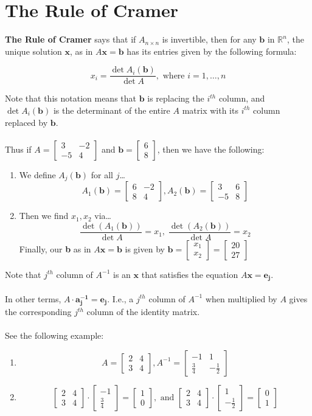 \documentclass[12pt]{article}
\newcommand{\R}{\mathbb{R}}
\newcommand{\bt}[1]{\textbf{{#1}}}
\newcommand{\bm}[1]{\mathbf{{#1}}}
\newcommand{\mb}{\begin{bmatrix}}
\newcommand{\me}{\end{bmatrix}}
\begin{document}
\section*{The Rule of Cramer}

\bt{The Rule of Cramer} says that if $A_{n \times n}$ is invertible,
then for any $\bm{b}$ in $\R^n$, the unique solution $\bm{x}$, as in $A\bm{x} = \bm{b}$ has
its entries given by the following formula:

$$x_i = \frac{\det A_i(\bm{b})}{\det A}, \textrm{ where } i = 1,\dots,n$$

Note that this notation means that $\bm{b}$ is replacing the $i^{th}$ column, and $\det A_i(\bm{b})$
is the determinant of the entire $A$ matrix with its $i^{th}$ column replaced by $\bm{b}$. \\ \\

Thus if $A = \mb 3 & -2 \\ -5 & 4 \me$ and $\bm{b} = \mb 6 \\ 8 \me$, then we have the following:

\begin{enumerate}
    \item We define $A_j(\bm{b})$ for all $j$\dots
    $$A_1(\bm{b}) = \mb 6 & -2 \\ 8 & 4 \me, A_2(\bm{b}) = \mb 3 & 6 \\ -5  & 8 \me$$
    \item Then we find $x_1, x_2$ via\dots
    $$\frac{\det (A_1(\bm{b}))}{\det A} = x_1, \; \frac{\det (A_2(\bm{b}))}{\det A} = x_2$$
    Finally, our \bt{b} as in $A\bm{x =b}$ is given by $\bm{b} = \mb x_1 \\ x_2 \me  = \mb 20 \\ 27 \me$
\end{enumerate}

Note that $j^{th}$ column of $A^{-1}$ is an $\bm{x}$ that satisfies the equation $A\bm{x}= \bm{e_j}$. \\ \\

In other terms, $A \cdot \bm{a^{-1}_j} = \bm{e_j}$. I.e., a $j^{th}$ column of $A^{-1}$ when multiplied by $A$ gives the corresponding $j^{th}$ column of the identity matrix. \\ \\

See the following example:

\begin{enumerate}
    \item $$A = \mb 2 & 4 \\ 3 & 4 \me, A^{-1} = \mb -1 & 1 \\ \frac{3}{4} & -\frac{1}{2} \me$$
    \item $$\mb 2 & 4 \\ 3 & 4 \me \cdot \mb -1 \\ \frac{3}{4} \me = \mb 1 \\ 0 \me, \textrm{ and }\mb 2 & 4 \\ 3 & 4 \me \cdot \mb 1 \\ -\frac{1}{2}\me = \mb 0 \\ 1 \me$$
\end{enumerate}
\end{document}
